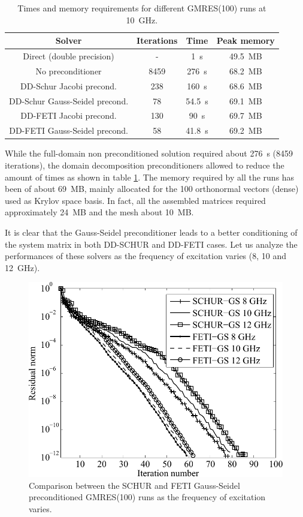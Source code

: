 \begin{table}[h!]
\begin{center}
\begin{tabular}{|c|c|c|c|}
\hline 
Solver & Iterations & Time & Peak memory \\ 
\hline
\hline 
Direct (double precision) & - & 1~s & 49.5~MB\\ \hline 
No preconditioner & 8459 & 276~s & 68.2~MB\\ \hline 
DD-Schur Jacobi precond. & 238 & 160~s & 68.6~MB\\ \hline 
DD-Schur Gauss-Seidel precond. & 78 & 54.5~s & 69.1~MB\\ \hline 
DD-FETI Jacobi precond. & 130 & 90~s & 69.7~MB\\ \hline 
DD-FETI Gauss-Seidel precond. & 58 & 41.8~s & 69.2~MB\\ \hline 
\end{tabular}
\end{center}
\caption{Times and memory requirements for different GMRES(100) runs at 10~GHz.}
\label{tab:gmresComp}
\end{table}

While the full-domain non preconditioned solution required about 276~s (8459 iterations), the domain decomposition preconditioners allowed to reduce the amount of times as shown in table \ref{tab:gmresComp}. The memory required by all the runs has been of about 69~MB, mainly allocated for the 100 orthonormal vectors (dense) used as Krylov space basis. In fact, all the assembled matrices required approximately 24~MB and the mesh about 10~MB.

It is clear that the Gauss-Seidel preconditioner leads to a better conditioning of the system matrix in both DD-SCHUR and DD-FETI cases. Let us analyze the performances of these solvers as the frequency of excitation varies (8, 10 and 12~GHz).

\begin{figure}[h!]
\centering
\includegraphics[width=13.4cm]{DDfreqComp}
\caption{Comparison between the SCHUR and FETI Gauss-Seidel preconditioned GMRES(100) runs as the frequency of excitation varies.}
\label{fig:DDfreqComp}
\end{figure}

